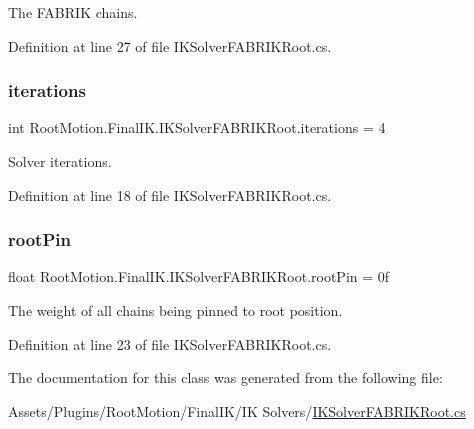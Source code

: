 The F\+A\+B\+R\+IK chains. 



Definition at line 27 of file I\+K\+Solver\+F\+A\+B\+R\+I\+K\+Root.\+cs.

\mbox{\label{class_root_motion_1_1_final_i_k_1_1_i_k_solver_f_a_b_r_i_k_root_a3b662ef787c8292122c22652724e5f61}} 
\subsubsection{\texorpdfstring{iterations}{iterations}}
{\footnotesize\ttfamily int Root\+Motion.\+Final\+I\+K.\+I\+K\+Solver\+F\+A\+B\+R\+I\+K\+Root.\+iterations = 4}



Solver iterations. 



Definition at line 18 of file I\+K\+Solver\+F\+A\+B\+R\+I\+K\+Root.\+cs.

\mbox{\label{class_root_motion_1_1_final_i_k_1_1_i_k_solver_f_a_b_r_i_k_root_a141f80e93f162d09807900b2aeb1e40c}} 
\subsubsection{\texorpdfstring{root\+Pin}{rootPin}}
{\footnotesize\ttfamily float Root\+Motion.\+Final\+I\+K.\+I\+K\+Solver\+F\+A\+B\+R\+I\+K\+Root.\+root\+Pin = 0f}



The weight of all chains being pinned to root position. 



Definition at line 23 of file I\+K\+Solver\+F\+A\+B\+R\+I\+K\+Root.\+cs.



The documentation for this class was generated from the following file\+:\begin{DoxyCompactItemize}
\item 
Assets/\+Plugins/\+Root\+Motion/\+Final\+I\+K/\+I\+K Solvers/\mbox{\hyperlink{_i_k_solver_f_a_b_r_i_k_root_8cs}{I\+K\+Solver\+F\+A\+B\+R\+I\+K\+Root.\+cs}}\end{DoxyCompactItemize}
